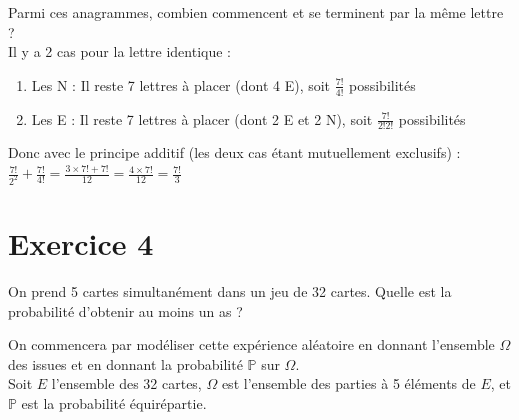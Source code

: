 \documentclass[11pt,a4paper]{article}
\begin{document}
\vspace{0.3cm}
Parmi ces anagrammes, combien commencent et se terminent par la même lettre ? \\
Il y a 2 cas pour la lettre identique :
\begin{enumerate}
    \item Les N : Il reste 7 lettres à placer (dont 4 E), soit $\frac{7!}{4!}$ possibilités
    
    \item Les E : Il reste 7 lettres à placer (dont 2 E et 2 N), soit $\frac{7!}{2!2!}$ possibilités
\end{enumerate}
Donc avec le principe additif (les deux cas étant mutuellement exclusifs) : $\frac{7!}{2^2} + \frac{7!}{4!} = \frac{3 \times 7! + 7!}{12} = \frac{4 \times 7!}{12} = \frac{7!}{3}$

\vspace{0.5cm}

\section*{Exercice 4}
On prend 5 cartes simultanément dans un jeu de 32 cartes. Quelle est la probabilité d'obtenir au moins un as ?

On commencera par modéliser cette expérience aléatoire en donnant l'ensemble $\Omega$ des issues et en donnant la probabilité $\mathbb{P}$ sur $\Omega$. \\
Soit $E$ l'ensemble des 32 cartes, $\Omega$ est l'ensemble des parties à 5 éléments de $E$, et $\mathbb{P}$ est la probabilité équirépartie.
\end{document}
